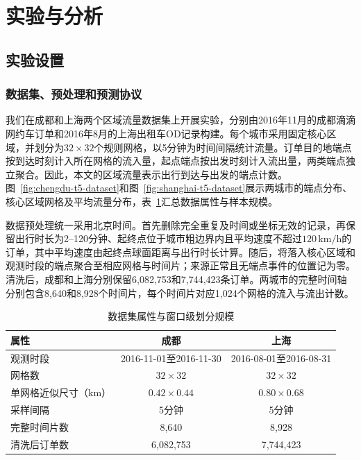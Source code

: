 \section{实验与分析}\label{sec:experiments}

\subsection{实验设置}\label{sec:exp-settings}

\subsubsection{数据集、预处理和预测协议}\label{sec:exp-datasets}

我们在成都和上海两个区域流量数据集上开展实验，分别由2016年11月的成都滴滴网约车订单和2016年8月的上海出租车OD记录构建。每个城市采用固定核心区域，并划分为\(32\times32\)个规则网格，以5分钟为时间间隔统计流量。订单目的地端点按到达时刻计入所在网格的流入量，起点端点按出发时刻计入流出量，两类端点独立聚合。因此，本文的区域流量表示出行到达与出发的端点计数。图~\ref{fig:chengdu-t5-dataset}和图~\ref{fig:shanghai-t5-dataset}展示两城市的端点分布、核心区域网格及平均流量分布，表~\ref{tab:dataset-summary}汇总数据属性与样本规模。

数据预处理统一采用北京时间。首先删除完全重复及时间或坐标无效的记录，再保留出行时长为2--120分钟、起终点位于城市粗边界内且平均速度不超过\(120\,\mathrm{km/h}\)的订单，其中平均速度由起终点球面距离与出行时长计算。随后，将落入核心区域和观测时段的端点聚合至相应网格与时间片；来源正常且无端点事件的位置记为零。清洗后，成都和上海分别保留6,082,753和7,744,423条订单。两城市的完整时间轴分别包含8,640和8,928个时间片，每个时间片对应1,024个网格的流入与流出计数。

\begin{table}[!htbp]
  \centering
  \caption{数据集属性与窗口级划分规模}
  \label{tab:dataset-summary}
  \small
  \begin{tabular}{lcc}
    \toprule
    属性 & 成都 & 上海 \\
    \midrule
    观测时段 & 2016-11-01至2016-11-30 & 2016-08-01至2016-08-31 \\
    网格数 & \(32\times32\) & \(32\times32\) \\
    单网格近似尺寸（km） & \(0.42\times0.44\) & \(0.80\times0.68\) \\
    采样间隔 & 5分钟 & 5分钟 \\
    完整时间片数 & 8,640 & 8,928 \\
    清洗后订单数 & 6,082,753 & 7,744,423 \\
    \bottomrule
  \end{tabular}
  \par\smallskip
\end{table}

